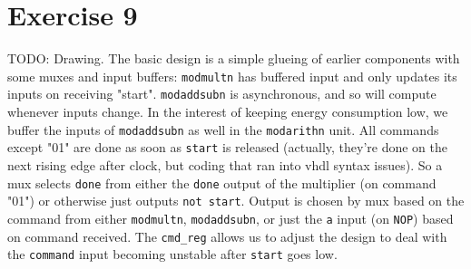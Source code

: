 \documentclass[a4paper,twoside]{article}
\newcommand{\atom}[1]{\mbox{\texttt{#1}}}
\begin{document}
\section*{Exercise 9}
TODO: Drawing. The basic design is a simple glueing of earlier components with
some muxes and input buffers: \atom{modmultn} has buffered input and only
updates its inputs on receiving "start".  \atom{modaddsubn} is asynchronous, and
so will compute whenever inputs change.  In the interest of keeping energy
consumption low, we buffer the inputs of \atom{modaddsubn} as well in the
\atom{modarithn} unit. All commands except "01" are done as soon as \atom{start}
is released (actually, they're done on the next rising edge after clock, but
coding that ran into vhdl syntax issues). So a mux selects \atom{done} from
either the \atom{done} output of the multiplier (on command "01") or otherwise
just outputs \atom{not start}. Output is chosen by mux based on the command from
either \atom{modmultn}, \atom{modaddsubn}, or just the \atom{a} input (on
\atom{NOP}) based on command received. The \atom{cmd\_reg} allows us to adjust
the design to deal with the \atom{command} input becoming unstable after
\atom{start} goes low.
\end{document}
